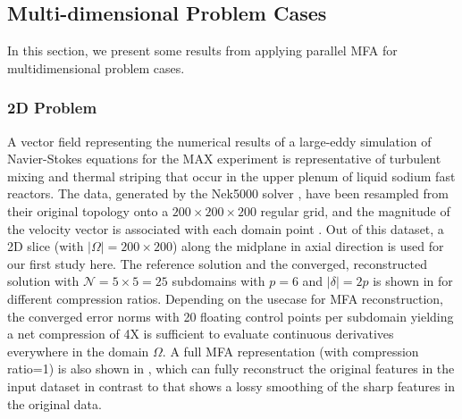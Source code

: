 

\subsection{Multi-dimensional Problem Cases}

In this section, we present some results from applying parallel MFA for multidimensional problem cases.

\subsubsection{2D Problem}

A  vector field representing the numerical results of a large-eddy simulation of Navier-Stokes equations for the MAX experiment \cite{merzari2010numerical} is representative of turbulent mixing and thermal striping that occur in the upper plenum of liquid sodium fast reactors. The data, generated by the Nek5000 solver \cite{deville2002}, have been resampled from their original topology onto a $200 \times 200 \times 200$ regular grid, and the magnitude of the velocity vector is associated with each  domain point \cite{peterka-mfa}.
%
Out of this dataset, a 2D slice (with $\left| \Omega \right|=200\times 200$) along the midplane in axial direction is used for our first study here. The reference solution and the converged, reconstructed solution with $\mathcal{N}=5 \times 5=25$ subdomains with $p=6$ and $\left| \delta \right|=2p$ is shown in  for different compression ratios. Depending on the usecase for MFA reconstruction, the converged error norms with 20 floating control points per subdomain yielding a net compression of 4X is sufficient to evaluate continuous derivatives everywhere in the domain $\Omega$. A full MFA representation (with compression ratio=1) is also shown in , which can fully reconstruct the original features in the input dataset in contrast to  that shows a lossy smoothing of the sharp features in the original data.

